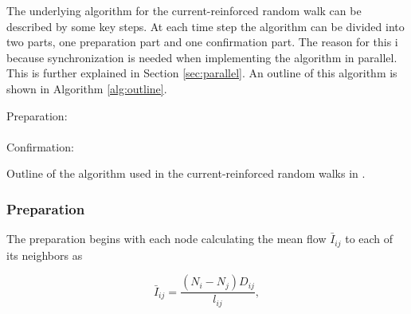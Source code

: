 The underlying algorithm for the current-reinforced random walk can be described by some key steps. At each time step the algorithm can be divided into two parts, one preparation part and one confirmation part. The reason for this i because synchronization is needed when implementing the algorithm in parallel. This is further explained in Section \ref{sec:parallel}. An outline of this algorithm is shown in Algorithm \ref{alg:outline}.

%

{
\vspace{1em}
\begin{algorithm}[H]
Preparation:\\
\ \\
Confirmation:\\
\caption{Outline of the algorithm used in the current-reinforced random walks in \cite{Sumpter}.}
\label{alg:outline}
\end{algorithm}
\vspace{1em}
}

\subsubsection{Preparation}
The preparation begins with each node calculating the mean flow $\bar{I}_{ij}$ to each of its neighbors as

\begin{equation}
\bar{I}_{ij} = \frac{(N_i - N_j)D_{ij}}{l_{ij}},
\end{equation}

